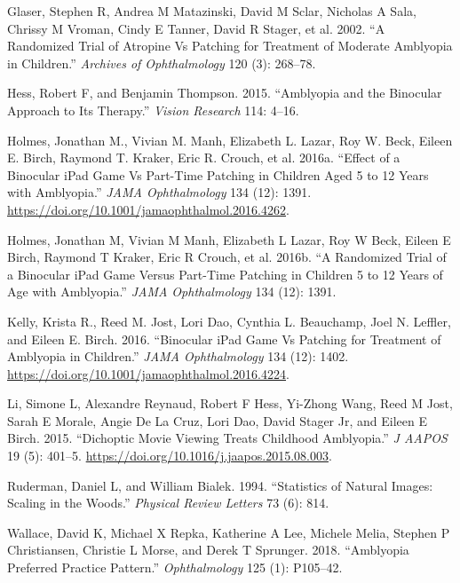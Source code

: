 \documentclass[
  sn-apa,
  pdflatex]{sn-jnl}
\theoremstyle{thmstyleone}%
\theoremstyle{thmstyletwo}%
\theoremstyle{thmstylethree}%
\newenvironment{CSLReferences}%
  {}%
  {\par}
\begin{document}
\begin{CSLReferences}{1}{0}
\leavevmode{}%
Glaser, Stephen R, Andrea M Matazinski, David M Sclar, Nicholas A Sala,
Chrissy M Vroman, Cindy E Tanner, David R Stager, et al. 2002. {``A
Randomized Trial of Atropine Vs Patching for Treatment of Moderate
Amblyopia in Children.''} \emph{Archives of Ophthalmology} 120 (3):
268--78.

\leavevmode{}%
Hess, Robert F, and Benjamin Thompson. 2015. {``Amblyopia and the
Binocular Approach to Its Therapy.''} \emph{Vision Research} 114: 4--16.

\leavevmode{}%
Holmes, Jonathan M., Vivian M. Manh, Elizabeth L. Lazar, Roy W. Beck,
Eileen E. Birch, Raymond T. Kraker, Eric R. Crouch, et al. 2016a.
{``Effect of a Binocular iPad Game Vs Part-Time Patching in Children
Aged 5 to 12 Years with Amblyopia.''} \emph{JAMA Ophthalmology} 134
(12): 1391. \url{https://doi.org/10.1001/jamaophthalmol.2016.4262}.

\leavevmode{}%
Holmes, Jonathan M, Vivian M Manh, Elizabeth L Lazar, Roy W Beck, Eileen
E Birch, Raymond T Kraker, Eric R Crouch, et al. 2016b. {``A Randomized
Trial of a Binocular iPad Game Versus Part-Time Patching in Children 5
to 12 Years of Age with Amblyopia.''} \emph{JAMA Ophthalmology} 134
(12): 1391.

\leavevmode{}%
Kelly, Krista R., Reed M. Jost, Lori Dao, Cynthia L. Beauchamp, Joel N.
Leffler, and Eileen E. Birch. 2016. {``Binocular iPad Game Vs Patching
for Treatment of Amblyopia in Children.''} \emph{JAMA Ophthalmology} 134
(12): 1402. \url{https://doi.org/10.1001/jamaophthalmol.2016.4224}.

\leavevmode{}%
Li, Simone L, Alexandre Reynaud, Robert F Hess, Yi-Zhong Wang, Reed M
Jost, Sarah E Morale, Angie De La Cruz, Lori Dao, David Stager Jr, and
Eileen E Birch. 2015. {``Dichoptic Movie Viewing Treats Childhood
Amblyopia.''} \emph{J AAPOS} 19 (5): 401--5.
\url{https://doi.org/10.1016/j.jaapos.2015.08.003}.

\leavevmode{}%
Ruderman, Daniel L, and William Bialek. 1994. {``Statistics of Natural
Images: Scaling in the Woods.''} \emph{Physical Review Letters} 73 (6):
814.

\leavevmode{}%
Wallace, David K, Michael X Repka, Katherine A Lee, Michele Melia,
Stephen P Christiansen, Christie L Morse, and Derek T Sprunger. 2018.
{``Amblyopia Preferred Practice Pattern{\textregistered}.''}
\emph{Ophthalmology} 125 (1): P105--42.


\end{CSLReferences}
\end{document}
